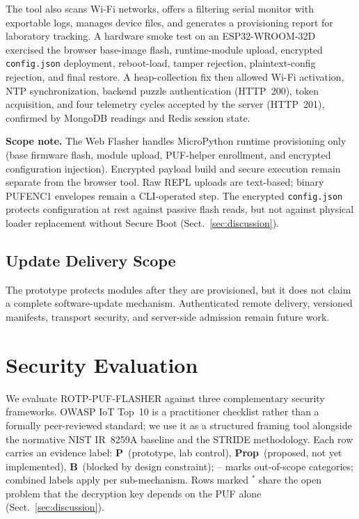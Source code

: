 \documentclass[runningheads]{llncs}
\begin{document}
\noindent The tool also scans Wi-Fi networks, offers a filtering serial monitor with exportable logs, manages device files, and generates a provisioning report for laboratory tracking. A hardware smoke test on an ESP32-WROOM-32D exercised the browser base-image flash, runtime-module upload, encrypted \texttt{config.json} deployment, reboot-load, tamper rejection, plaintext-config rejection, and final restore. A heap-collection fix then allowed Wi-Fi activation, NTP synchronization, backend puzzle authentication (HTTP~200), token acquisition, and four telemetry cycles accepted by the server (HTTP~201), confirmed by MongoDB readings and Redis session state.

\medskip
\noindent\textbf{Scope note.} The Web Flasher handles MicroPython runtime provisioning only (base firmware flash, module upload, PUF-helper enrollment, and encrypted configuration injection). Encrypted payload build and secure execution remain separate from the browser tool. Raw REPL uploads are text-based; binary PUFENC1 envelopes remain a CLI-operated step. The encrypted \texttt{config.json} protects configuration at rest against passive flash reads, but not against physical loader replacement without Secure Boot (Sect.~\ref{sec:discussion}).

\subsection{Update Delivery Scope}

The prototype protects modules after they are provisioned, but it does not claim a complete software-update mechanism. Authenticated remote delivery, versioned manifests, transport security, and server-side admission remain future work.


\section{Security Evaluation}
\label{sec:security}


We evaluate ROTP-PUF-FLASHER against three complementary security frameworks. OWASP IoT Top~10 is a practitioner checklist rather than a formally peer-reviewed standard; we use it as a structured framing tool alongside the normative NIST IR~8259A baseline and the STRIDE methodology. Each row carries an evidence label: \textbf{P}~(prototype, lab control), \textbf{Prop}~(proposed, not yet implemented), \textbf{B}~(blocked by design constraint); -- marks out-of-scope categories; combined labels apply per sub-mechanism. Rows marked $^*$ share the open problem that the decryption key depends on the PUF alone (Sect.~\ref{sec:discussion}).
\end{document}
